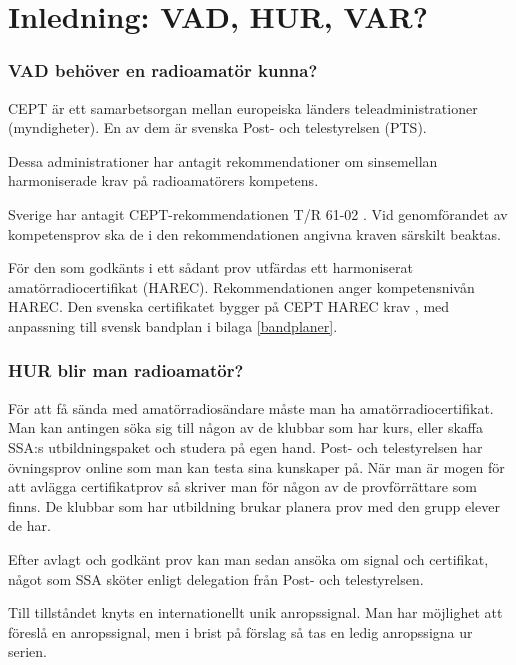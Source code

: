 
\chapter*{Inledning: VAD, HUR, VAR?}

\subsection*{VAD behöver en radioamatör kunna?}

CEPT är ett samarbetsorgan mellan europeiska länders teleadministrationer
(myndigheter). En av dem är svenska Post- och telestyrelsen (PTS).

Dessa administrationer har antagit rekommendationer om sinsemellan
harmoniserade krav på radioamatörers kompetens.

Sverige har antagit CEPT-rekommendationen T/R 61-02 \cite{TR6102}.
Vid genomförandet av kompetensprov ska de i den rekommendationen
angivna kraven särskilt beaktas.

För den som godkänts i ett sådant prov utfärdas ett harmoniserat
amatörradiocertifikat (HAREC).
Rekommendationen anger kompetensnivån HAREC.
Den svenska certifikatet bygger på CEPT HAREC krav \cite{TR6102},
med anpassning till svensk bandplan i bilaga \ref{bandplaner}.

\subsection*{HUR blir man radioamatör?}

För att få sända med amatörradiosändare måste man ha amatörradiocertifikat.
Man kan antingen söka sig till någon av de klubbar som har kurs, eller skaffa SSA:s utbildningspaket och studera på egen hand. Post- och telestyrelsen har övningsprov online som man kan testa sina kunskaper på.
När man är mogen för att avlägga certifikatprov så skriver man för någon av de provförrättare som finns. De klubbar som har utbildning brukar planera prov med den grupp elever de har.

\newpage

Efter avlagt och godkänt prov kan man sedan ansöka om signal och certifikat, något som SSA sköter enligt delegation från Post- och telestyrelsen.

Till tillståndet knyts en internationellt unik anropssignal. Man har möjlighet
att föreslå en anropssignal, men i brist på förslag så tas en ledig anropssigna
ur serien.

